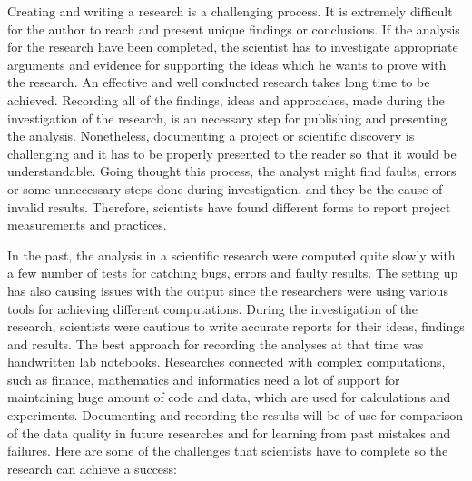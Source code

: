 
Creating and writing a research is a challenging process. It is extremely difficult for the author to reach and present unique findings or conclusions. If the analysis for the research have been completed, the scientist has to investigate appropriate arguments and evidence for supporting the ideas which he wants to prove with the research. An effective and well conducted research takes long time to be achieved. Recording all of the findings, ideas and approaches, made during the investigation of the research, is an necessary step for publishing and presenting the analysis. Nonetheless, documenting a project or scientific discovery is challenging and it has to be properly presented to the reader so that it would be understandable. Going thought this process, the analyst might find faults, errors or some unnecessary steps done during investigation, and they be the cause of invalid results. Therefore, scientists have found different forms to report project measurements and practices.\cite{holmes2003reworking}

In the past, the analysis in a scientific research were computed quite slowly with a few number of tests for catching bugs, errors and faulty results. The setting up has also causing issues with the output since the researchers were using various tools for achieving different computations. During the investigation of the research, scientists were cautious to write accurate reports for their ideas, findings and results. The best approach for recording the analyses at that time was handwritten lab notebooks. Researches connected with complex computations, such as finance, mathematics and informatics need a lot of support for maintaining huge amount of code and data, which are used for calculations and experiments. Documenting and recording the results will be of use for comparison of the data quality in future researches and for learning from past mistakes and failures.\cite{guo2012burrito}
Here are some of the challenges that scientists have to complete so the research can achieve a success:\cite{guo2012burrito}

